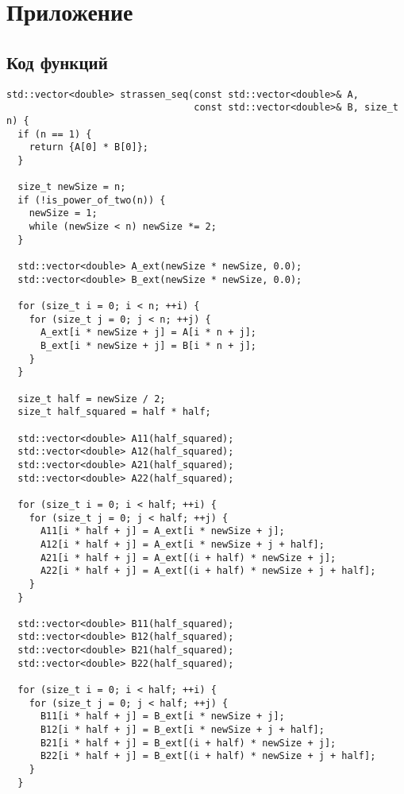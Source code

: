 \documentclass[a4paper,12pt]{article}
\begin{document}
\section{Приложение}
\subsection{Код функций}
\begin{lstlisting}[caption={Функция strassen\_seq}]
std::vector<double> strassen_seq(const std::vector<double>& A,
                                 const std::vector<double>& B, size_t n) {
  if (n == 1) {
    return {A[0] * B[0]};
  }

  size_t newSize = n;
  if (!is_power_of_two(n)) {
    newSize = 1;
    while (newSize < n) newSize *= 2;
  }

  std::vector<double> A_ext(newSize * newSize, 0.0);
  std::vector<double> B_ext(newSize * newSize, 0.0);

  for (size_t i = 0; i < n; ++i) {
    for (size_t j = 0; j < n; ++j) {
      A_ext[i * newSize + j] = A[i * n + j];
      B_ext[i * newSize + j] = B[i * n + j];
    }
  }

  size_t half = newSize / 2;
  size_t half_squared = half * half;

  std::vector<double> A11(half_squared);
  std::vector<double> A12(half_squared);
  std::vector<double> A21(half_squared);
  std::vector<double> A22(half_squared);

  for (size_t i = 0; i < half; ++i) {
    for (size_t j = 0; j < half; ++j) {
      A11[i * half + j] = A_ext[i * newSize + j];
      A12[i * half + j] = A_ext[i * newSize + j + half];
      A21[i * half + j] = A_ext[(i + half) * newSize + j];
      A22[i * half + j] = A_ext[(i + half) * newSize + j + half];
    }
  }

  std::vector<double> B11(half_squared);
  std::vector<double> B12(half_squared);
  std::vector<double> B21(half_squared);
  std::vector<double> B22(half_squared);

  for (size_t i = 0; i < half; ++i) {
    for (size_t j = 0; j < half; ++j) {
      B11[i * half + j] = B_ext[i * newSize + j];
      B12[i * half + j] = B_ext[i * newSize + j + half];
      B21[i * half + j] = B_ext[(i + half) * newSize + j];
      B22[i * half + j] = B_ext[(i + half) * newSize + j + half];
    }
  }


\end{lstlisting}
\end{document}
